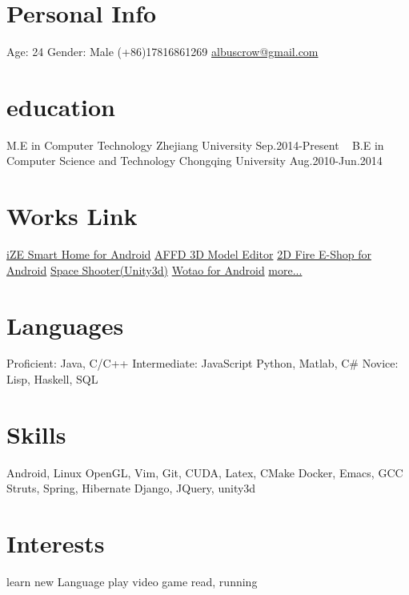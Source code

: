 \documentclass[]{friggeri-cv} %
\begin{document}


\begin{aside} %
\section{Personal Info}
Age: 24
Gender: Male
(+86)17816861269
\href{mailto:albuscrow@gmail.com}{albuscrow@gmail.com}
\section{education}
M.E in Computer Technology
Zhejiang University
Sep.2014-Present
~
B.E in Computer Science and Technology
Chongqing University
Aug.2010-Jun.2014
\section{Works Link}
\href{http://www.hisensehitachi.com/jstx/index.aspx?nodeid=1162}{iZE Smart Home for Android}
\href{https://github.com/albuscrow/AFFD}{AFFD 3D Model Editor}
\href{http://www.jinxizi.cn/android/huozhanggui.html}{2D Fire E-Shop for Android}
\href{https://github.com/albuscrow/learn_unity}{Space Shooter(Unity3d)}
\href{http://36kr.com/p/5043478.html}{Wotao for Android}
\href{https://github.com/albuscrow}{more...}
\section{Languages}
Proficient: Java, C/C++
Intermediate: JavaScript
Python, Matlab, C\#
Novice: Lisp, Haskell, SQL
\section{Skills}
\LARGE{Android}\normalsize{, }\LARGE{Linux}
\large{OpenGL}\normalsize{, }\large{Vim}\normalsize{, }\large{Git}\normalsize{, }
\normalsize{CUDA, Latex, CMake}
\normalsize{Docker, Emacs, GCC}
\small{Struts}\normalsize{, }\small{Spring}\normalsize{, }\small{Hibernate}
\small{Django}\normalsize{, }\small{JQuery}\normalsize{, }\small{unity3d}
\section{Interests}
\normalsize{learn new Language
play video game
read, running}
\end{aside}
\end{document}
